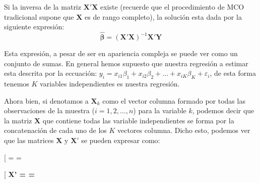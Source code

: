 \documentclass[
  a4paper,
]{article}
\begin{document}
Si la inversa de la matriz \(\mathbf{X'X}\) existe (recuerde que el
procedimiento de MCO tradicional supone que \(\mathbf{X}\) es de rango
completo), la solución esta dada por la siguiente expresión: \[
\hat{\boldsymbol \beta} = (\mathbf{X'X})^{-1}\mathbf{X'Y}
\]

Esta expresión, a pesar de ser en apariencia compleja se puede ver como
un conjunto de sumas. En general hemos supuesto que nuestra regresión a
estimar esta descrita por la eccuación:
\(y_i = x_{i1}\beta_1 + x_{i2}\beta_2 + \ldots + x_{iK}\beta_K + \varepsilon_i\),
de esta forma tenemos \(K\) variables independientes es nuestra
regresión.

Ahora bien, si denotamos a \(\mathbf{X}_k\) como el vector columna
formado por todas las observaciones de la muestra
(\(i = 1, 2, \ldots, n\)) para la variable \(k\), podemos decir que la
matriz \(\mathbf X\) que contiene todas las variable independientes se
forma por la concatenación de cada uno de los \(K\) vectores columna.
Dicho esto, podemos ver que las matrices \(\mathbf{X}\) y
\(\mathbf{X'}\) se pueden expresar como:

{[}  =  = \left[ \begin{array}{ccccc}
\mathbf{X}_1 & \mathbf{X}_2& \mathbf{X}_3 & \ldots & \mathbf{X}_K
\end{array} \right]{]}

{[} \bf{X'} = 
 =
\]\\
\end{document}
